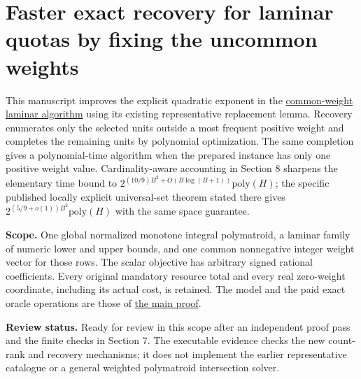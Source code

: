 
\hypertarget{af-fe230a140d-faster-exact-recovery-for-laminar-quotas-by-fixing-the-uncommon-weights}{%
\section{Faster exact recovery for laminar quotas by fixing the uncommon weights}\label{af-fe230a140d-faster-exact-recovery-for-laminar-quotas-by-fixing-the-uncommon-weights}}

This manuscript improves the explicit quadratic exponent in the \href{https://github.com/icekylinx/algorithm-frontier/blob/main/problems/weighted-prefix-quota-frontier/proof.md}{common-weight laminar algorithm} using its existing representative replacement lemma. Recovery enumerates only the selected units outside a most frequent positive weight and completes the remaining units by polynomial optimization. The same completion gives a polynomial-time algorithm when the prepared instance has only one positive weight value. Cardinality-aware accounting in Section 8 sharpens the elementary time bound to \(2^{(10/9)B^2+O(B\log(B+1))}\mathrm{poly}(H)\); the specific published locally explicit universal-set theorem stated there gives \(2^{(5/9+o(1))B^2}\mathrm{poly}(H)\) with the same space guarantee.

\textbf{Scope.} One global normalized monotone integral polymatroid, a laminar family of numeric lower and upper bounds, and one common nonnegative integer weight vector for those rows. The scalar objective has arbitrary signed rational coefficients. Every original mandatory resource total and every real zero-weight coordinate, including its actual cost, is retained. The model and the paid exact oracle operations are those of \href{https://github.com/icekylinx/algorithm-frontier/blob/main/problems/weighted-prefix-quota-frontier/proof.md\#1-model-and-theorem}{the main proof}.

\textbf{Review status.} Ready for review in this scope after an independent proof pass and the finite checks in Section 7. The executable evidence checks the new count-rank and recovery mechanisms; it does not implement the earlier representative catalogue or a general weighted polymatroid intersection solver.

